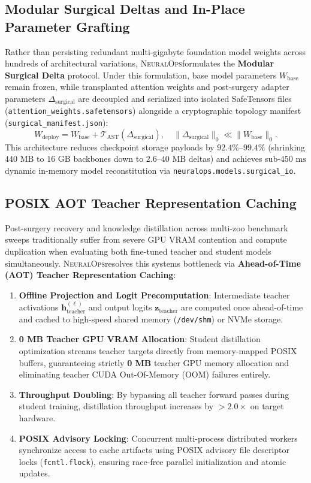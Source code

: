 \documentclass{article}
\newcommand{\systemname}{\textsc{NeuralOps}}
\begin{document}
\subsection{Modular Surgical Deltas and In-Place Parameter Grafting}
Rather than persisting redundant multi-gigabyte foundation model weights across hundreds of architectural variations, \systemname formulates the \textbf{Modular Surgical Delta} protocol. Under this formulation, base model parameters $W_{\text{base}}$ remain frozen, while transplanted attention weights and post-surgery adapter parameters $\Delta_{\text{surgical}}$ are decoupled and serialized into isolated SafeTensors files (\texttt{attention\_weights.safetensors}) alongside a cryptographic topology manifest (\texttt{surgical\_manifest.json}):
\begin{equation}
    W_{\text{deploy}} = W_{\text{base}} + \mathcal{T}_{\text{AST}}(\Delta_{\text{surgical}}), \quad \|\Delta_{\text{surgical}}\|_0 \ll \|W_{\text{base}}\|_0.
\end{equation}
This architecture reduces checkpoint storage payloads by $92.4\%\text{--}99.4\%$ (shrinking $440\text{ MB}$ to $16\text{ GB}$ backbones down to $2.6\text{--}40\text{ MB}$ deltas) and achieves sub-$450\text{ ms}$ dynamic in-memory model reconstitution via \texttt{neuralops.models.surgical\_io}.

\subsection{POSIX AOT Teacher Representation Caching}
Post-surgery recovery and knowledge distillation across multi-zoo benchmark sweeps traditionally suffer from severe GPU VRAM contention and compute duplication when evaluating both fine-tuned teacher and student models simultaneously. \systemname resolves this systems bottleneck via \textbf{Ahead-of-Time (AOT) Teacher Representation Caching}:
\begin{enumerate}
    \item \textbf{Offline Projection and Logit Precomputation}: Intermediate teacher activations $\mathbf{h}_{\text{teacher}}^{(\ell)}$ and output logits $\mathbf{z}_{\text{teacher}}$ are computed once ahead-of-time and cached to high-speed shared memory (\texttt{/dev/shm}) or NVMe storage.
    \item \textbf{0 MB Teacher GPU VRAM Allocation}: Student distillation optimization streams teacher targets directly from memory-mapped POSIX buffers, guaranteeing strictly \textbf{0 MB} teacher GPU memory allocation and eliminating teacher CUDA Out-Of-Memory (OOM) failures entirely.
    \item \textbf{Throughput Doubling}: By bypassing all teacher forward passes during student training, distillation throughput increases by $>2.0\times$ on target hardware.
    \item \textbf{POSIX Advisory Locking}: Concurrent multi-process distributed workers synchronize access to cache artifacts using POSIX advisory file descriptor locks (\texttt{fcntl.flock}), ensuring race-free parallel initialization and atomic updates.
\end{enumerate}
\end{document}

